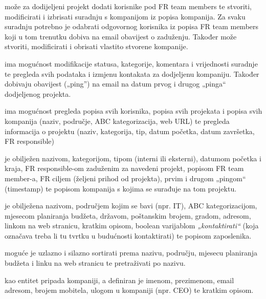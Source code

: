 		{ može za dodijeljeni projekt dodati korisnike pod FR team members te stvoriti, modificirati i izbrisati suradnju s kompanijom iz popisa kompanija. Za svaku suradnju potrebno je odabrati odgovornog korisnika iz popisa FR team members koji u tom trenutku dobiva na email obavijest o zaduženju. Također može stvoriti, modificirati i obrisati vlastito stvorene kompanije.}\vspace{0.1cm}

		{ ima mogućnost modifikacije statusa, kategorije, komentara i vrijednosti suradnje te pregleda svih podataka i izmjenu kontakata za dodjeljenu kompaniju. Također dobivaju obavijest („ping”) na email na datum prvog i drugog „pinga“ dodjeljenog projekta.}\vspace{0.1cm}

		{ ima mogućnost pregleda popisa svih korisnika, popisa svih projekata i popisa svih kompanija (naziv, područje, ABC kategorizacija, web URL) te pregleda informacija o projektu (naziv, kategorija, tip, datum početka, datum završetka, FR responsible)}\vspace{0.3cm}
		

		{ je obilježen nazivom, kategorijom, tipom (interni ili eksterni), datumom početka i kraja, FR responsible-om zaduženim za navedeni projekt, popisom FR team member-a, FR ciljem (željeni prihod od projekta), prvim i drugom „pingom“ (timestamp) te popisom kompanija s kojima se surađuje na tom projektu.}\vspace{0.1cm}

		{ je obilježena nazivom, područjem kojim se bavi (npr. IT), ABC kategorizacijom, mjesecom planiranja budžeta, državom, poštanskim brojem, gradom, adresom, linkom na web stranicu, kratkim opisom, boolean varijablom \textit{„kontaktirati“} (koja označava treba li tu tvrtku u budućnosti kontaktirati) te popisom zaposlenika.}\vspace{0.1cm}
		
		{ moguće je uzlazno i silazno sortirati prema nazivu, području, mjesecu planiranja budžeta i linku na web stranicu te pretraživati po nazivu.}\vspace{0.1cm}

		{ kao entitet pripada kompaniji, a definiran je imenom, prezimenom, email adresom, brojem mobitela, ulogom u kompaniji (npr. CEO) te kratkim opisom.}\vspace{0.1cm}

